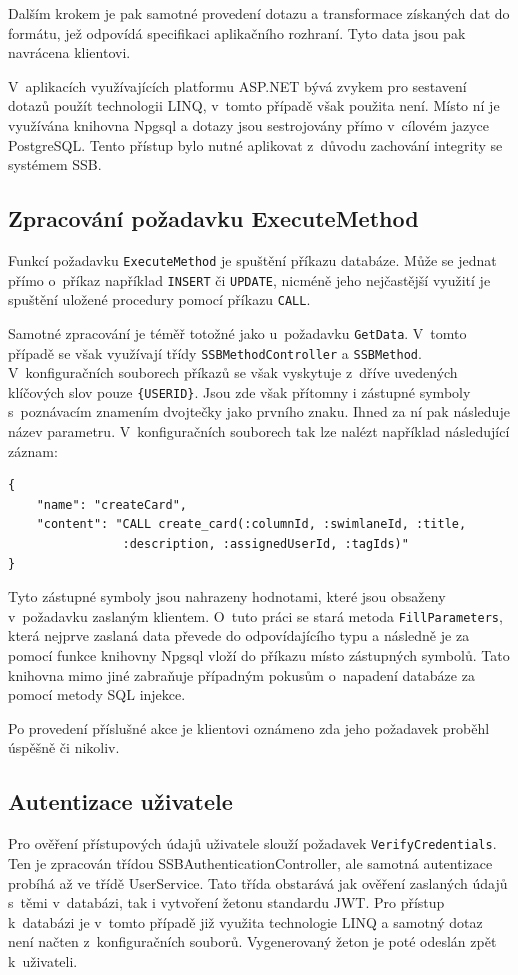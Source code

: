 Dalším krokem je pak samotné provedení dotazu a transformace získaných dat do formátu, jež odpovídá specifikaci aplikačního rozhraní. Tyto data jsou pak navrácena klientovi.

V~aplikacích využívajících platformu ASP.NET bývá zvykem pro sestavení dotazů použít technologii LINQ, v~tomto případě však použita není. Místo ní je využívána knihovna Npgsql a dotazy jsou sestrojovány přímo v~cílovém jazyce PostgreSQL. Tento přístup bylo nutné aplikovat z~důvodu zachování integrity se systémem SSB.

\subsection{Zpracování požadavku ExecuteMethod}
Funkcí požadavku \texttt{ExecuteMethod} je spuštění příkazu databáze. Může se jednat přímo o~příkaz například \texttt{INSERT} či \texttt{UPDATE}, nicméně jeho nejčastější využití je spuštění uložené procedury pomocí příkazu \texttt{CALL}.

Samotné zpracování je téměř totožné jako u~požadavku \texttt{GetData}. V~tomto případě se však využívají třídy \texttt{SSBMethodController} a \texttt{SSBMethod}. V~konfiguračních souborech příkazů se však vyskytuje z~dříve uvedených klíčových slov pouze \texttt{\{USERID\}}. Jsou zde však přítomny i zástupné symboly s~poznávacím znamením dvojtečky jako prvního znaku. Ihned za ní pak následuje název parametru. V~konfiguračních souborech tak lze nalézt například následující záznam:

\begin{verbatim}
{
    "name": "createCard",
    "content": "CALL create_card(:columnId, :swimlaneId, :title,
                :description, :assignedUserId, :tagIds)"
}
\end{verbatim}

Tyto zástupné symboly jsou nahrazeny hodnotami, které jsou obsaženy v~požadavku zaslaným klientem. O~tuto práci se stará metoda \texttt{FillParameters}, která nejprve zaslaná data převede do odpovídajícího typu a následně je za pomocí funkce knihovny Npgsql vloží do příkazu místo zástupných symbolů. Tato knihovna mimo jiné zabraňuje případným pokusům o~napadení databáze za pomocí metody SQL injekce. 

Po provedení příslušné akce je klientovi oznámeno zda jeho požadavek proběhl úspěšně či nikoliv.

\subsection{Autentizace uživatele}
Pro ověření přístupových údajů uživatele slouží požadavek \texttt{VerifyCredentials}. Ten je zpracován třídou SSBAuthenticationController, ale samotná autentizace probíhá až ve třídě UserService. Tato třída obstarává jak ověření zaslaných údajů s~těmi v~databázi, tak i vytvoření žetonu standardu JWT. Pro přístup k~databázi je v~tomto případě již využita technologie LINQ a samotný dotaz není načten z~konfiguračních souborů. Vygenerovaný žeton je poté odeslán zpět k~uživateli.




